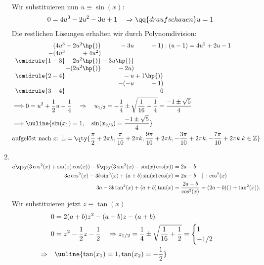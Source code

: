 \begin{enumerate}[label=(\alph*)]
\begin{align}
    \end{align}
    Wir substituieren nun $u \equiv \sin(x)$:
    \begin{align}
        0 = 4u^3 - 2u^2 -3u +1 \quad \Rightarrow \qq{draufschauen} u = 1
    \end{align}
    Die restlichen Lösungen erhalten wir durch Polynomdivision: 
    \begin{align}
        &\begin{array}{r@{} r@{} r@{} r@{} r}
            (4u^3 &{}-2u^2\hp{)}&{}-3u&{}+1) &\;:(u-1) = 4u^2+2u-1 \\
          -(4u^3 &{}+4u^2) \\ 
          \cmidrule{1-3}
                & 2u^2 \hp{)} &{}-3u\hp{)}&{}\\
                &-(2u^2 \hp{)}&{}-2u)&{} \\
          \cmidrule{2-4}
                & &{}-u&{}+1\hp{)}\\
                & &-(-u&{}+1)\\
          \cmidrule{3-4} 
                & & & 0
        \end{array}\\
        & \Longrightarrow 0 = u^2 + \frac{1}{2}u-\frac{1}{4} \quad \Rightarrow \quad u_{1/2} = - \frac{1}{4}\pm \sqrt{\frac{1}{16}+\frac{1}{4}} = \frac{-1 \pm \sqrt{5}}{4} \\
        & \Longrightarrow \uuline{\sin(x_1) = 1, \quad \sin(x_{2/3}) = \frac{-1 \pm \sqrt{5}}{4}} \\
        & \text{aufgelöst nach $x$: } \mathbb{L} = \qty{\frac{\pi}{2}+2\pi k, \frac{\pi}{10}+2\pi k, \frac{9\pi}{10}+2\pi k, -\frac{3\pi}{10}+2\pi k, -\frac{7\pi}{10} + 2\pi k |k \in \mathbb{Z} }
    \end{align}
    \item$~$\\[-1.5cm] 
    \begin{align}
        a\qty(3\cos^2(x)+\sin(x)\cos(x))-b\qty(3\sin^2(x)-\sin(x)\cos(x))&=2a-b \\
        3a \cos^2(x) - 3b \sin^2(x) + (a+b)\sin(x)\cos(x) &= 2a-b \quad |\; :\cos^2(x)\\
        3a - 3b \tan^2(x) + (a+b) \tan(x) &= \frac{2a-b}{\cos^2(x)} = (2a-b) (1+\tan^2(x)).  
    \end{align}
    Wir substituieren jetzt $z \equiv \tan(x)$ 
    \begin{align}
        0&= 2(a+b)z^2 - (a+b)z -(a+b) \\
        0&= z^2 - \frac{1}{2}z - \frac{1}{2} \quad \Rightarrow z_{1/2} = \frac{1}{4} \pm \sqrt{\frac{1}{16}+\frac{1}{2}} = \begin{cases}
            1 \\ -1/2
        \end{cases} \\
        \Rightarrow \quad& \uuline{\tan(x_1) = 1, \tan(x_2) = -\frac{1}{2}} 
    \end{align}
\end{enumerate}

